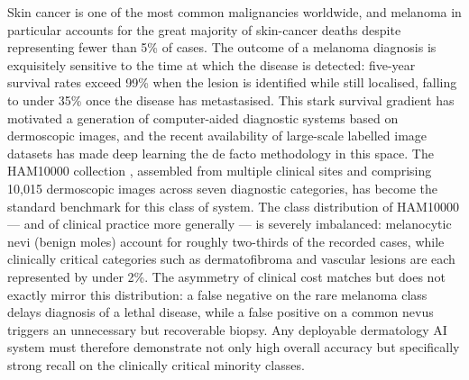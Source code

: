 \documentclass[11pt,a4paper]{article}
\begin{document}
Skin cancer is one of the most common malignancies worldwide, and
melanoma in particular accounts for the great majority of skin-cancer
deaths despite representing fewer than 5\% of cases. The outcome of a
melanoma diagnosis is exquisitely sensitive to the time at which the
disease is detected: five-year survival rates exceed 99\% when the
lesion is identified while still localised, falling to under 35\% once
the disease has metastasised. This stark survival gradient has
motivated a generation of computer-aided diagnostic systems based on
dermoscopic images, and the recent availability of large-scale
labelled image datasets has made deep learning the de facto
methodology in this space. The HAM10000 collection
\citep{tschandl2018ham10000}, assembled from multiple clinical sites
and comprising 10{,}015 dermoscopic images across seven diagnostic
categories, has become the standard benchmark for this class of
system. The class distribution of HAM10000 --- and of clinical
practice more generally --- is severely imbalanced: melanocytic nevi
(benign moles) account for roughly two-thirds of the recorded cases,
while clinically critical categories such as dermatofibroma and
vascular lesions are each represented by under 2\%. The asymmetry of
clinical cost matches but does not exactly mirror this distribution:
a false negative on the rare melanoma class delays diagnosis of a
lethal disease, while a false positive on a common nevus triggers an
unnecessary but recoverable biopsy. Any deployable dermatology AI
system must therefore demonstrate not only high overall accuracy but
specifically strong recall on the clinically critical minority
classes.
\end{document}
